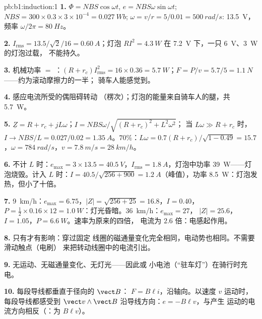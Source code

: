 \begin{solution}{pb:b1:induction:1}
\textbf{1.} $\Phi = NBS\cos\omega t$, $e = NBS\omega\sin\omega t$; $NBS = 300 \times
0.3 \times 3 \times 10^{-4} = \qty{0.027}{Wb}$; $\omega = v/r = 5/0.01 = \qty{500}{rad/s}$:
 \qty{13.5}{V}，频率 $\omega/2\pi = \qty{80}{Hz}$。

\textbf{2.} $I_{\text{rms}} = 13.5/\sqrt2/16 = \qty{0.60}{A}$；灯泡 $RI^2 = \qty{4.3}{W}$
在 \qty{7.2}{V} 下，一只 \qty{6}{V}、\qty{3}{W} 的灯泡过载，
不能持久。

\textbf{3.} 机械功率 $=$ ：$(R + r_c)I_{\text{rms}}^2 = 16 \times 0.36 =
\qty{5.7}{W}$；$F = P/v = 5.7/5 = \qty{1.1}{N}$——约为滚动摩擦力的一半；
骑车人能感觉到。

\textbf{4.} 感应电流所受的偶阻碍转动
（楞次）；灯泡的能量来自骑车人的腿，共 \qty{5.7}{W}。

\textbf{5.} $\underline Z = R + r_c + jL\omega$；$I = NBS\omega/\sqrt{(R + r_c)^2 + L^2\omega^2}$；
当 $L\omega \gg R + r_c$ 时，$I \to NBS/L = 0.027/0.02 = \qty{1.35}{A}$。$70\%$：$L\omega
= 0.7(R + r_c)/\sqrt{1 - 0.49} = 15.7$，$\omega = \qty{784}{rad/s}$，$v = \qty{7.8}{m/s}
= \qty{28}{km/h}$。

\textbf{6.} 不计 $L$ 时：$e_{\max} = 3 \times 13.5 = \qty{40.5}{V}$，$I_{\text{rms}} =
\qty{1.8}{A}$，灯泡中功率 \qty{39}{W}——灯泡烧毁。计入 $L$ 时：$I = 40.5/\sqrt{256 +
900} = \qty{1.2}{A}$（峰值），功率 \qty{8.5}{W}：灯泡发热，但小了十倍。

\textbf{7.} \qty{9}{km/h}：$e_{\max} = 6.75$，$|Z| = \sqrt{256 + 25} = 16.8$，$I = 0.40$，
$P = \tfrac12 \times 0.16 \times 12 = \qty{1.0}{W}$：灯光昏暗。\qty{36}{km/h}：$e_{\max} = 27$，
$|Z| = 25.6$，$I = 1.05$，$P = \qty{6.6}{W}$。速率为原来的四倍，
电流为 $2.6$ 倍：电感起作用。

\textbf{8.} 只有才有影响：穿过固定
线圈的磁通量变化完全相同，电动势也相同。不需要滑动触点（电刷）
来把转动线圈中的电流引出。

\textbf{9.} 无运动、无磁通量变化、无灯光——因此或
小电池（“驻车灯”）在骑行时充电。

\textbf{10.} 每段导线都垂直于径向的 $\vect B$：
$F = B\ell i$，沿轴向。以速度 $v$ 运动时，每段导线都感受到 $\vect v\wedge\vect B$
沿导线方向：$e = -B\ell v$，与产生
运动的电流方向相反（：为 $B\ell v$）。


\end{solution}
